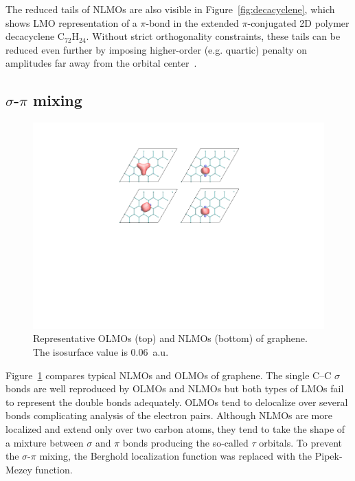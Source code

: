 \documentclass[aps,prl,reprint,amsmath,amssymb]{revtex4-1}
\begin{document}
The reduced tails of NLMOs are also visible in Figure~\ref{fig:decacyclene}, which shows LMO representation of a $\pi$-bond in the extended $\pi$-conjugated 2D polymer decacyclene C$_{72}$H$_{24}$. Without strict orthogonality constraints, these tails can be reduced even further by imposing higher-order (e.g. quartic) penalty on amplitudes far away from the orbital center~\cite{hoyvik2012orbital}.

\subsection{$\sigma$-$\pi$ mixing}

\begin{figure}[hbpt]
\centering
\includegraphics[scale=0.7]{graphene.pdf}
\caption{Representative OLMOs (top) and NLMOs (bottom) of graphene. The isosurface value is 0.06~a.u.
}
\label{fig:graphene}
\end{figure}

Figure~\ref{fig:graphene} compares typical NLMOs and OLMOs of graphene. 
The single C--C $\sigma$ bonds are well reproduced by OLMOs and NLMOs but both types of LMOs fail to represent the double bonds adequately.  OLMOs tend to delocalize over several bonds complicating analysis of the electron pairs. Although NLMOs are more localized and extend only over two carbon atoms, they tend to take the shape of a mixture between $\sigma$ and $\pi$ bonds producing the so-called $\tau$ orbitals. To prevent the $\sigma$-$\pi$ mixing, the Berghold localization function was replaced with the Pipek-Mezey function. 
\end{document}
